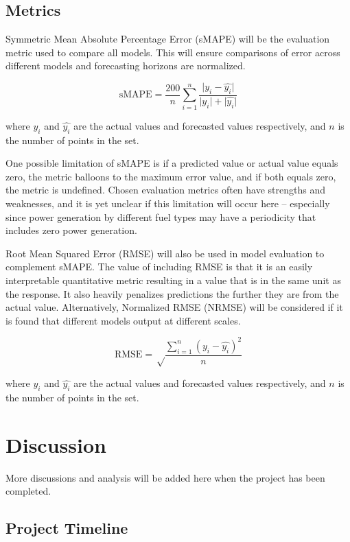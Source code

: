 \documentclass[sigconf]{acmart}
\begin{document}
\subsection{Metrics}
Symmetric Mean Absolute Percentage Error (sMAPE) will be the evaluation metric used to compare all models. This will ensure comparisons of error across different models and forecasting horizons are normalized. 

\begin{equation}
\text{sMAPE} =\frac{200}{n}\sum_{i=1}^{n}\frac{\lvert y_i - \hat{y_i} \rvert}{\lvert y_i \rvert + \lvert \hat{y_i} \rvert}
\end{equation}

where $y_i$ and $\hat{y_i}$ are the actual values and forecasted values respectively, and $n$ is the number of points in the set.

One possible limitation of sMAPE is if a predicted value or actual value equals zero, the metric balloons to the maximum error value, and if both equals zero, the metric is undefined. Chosen evaluation metrics often have strengths and weaknesses, and it is yet unclear if this limitation will occur here -- especially since power generation by different fuel types may have a periodicity that includes zero power generation.

Root Mean Squared Error (RMSE) will also be used in model evaluation to complement sMAPE. The value of including RMSE is that it is an easily interpretable quantitative metric resulting in a value that is in the same unit as the response. It also heavily penalizes predictions the further they are from the actual value. Alternatively, Normalized RMSE (NRMSE) will be considered if it is found that different models output at different scales.

\begin{equation}
\text{RMSE} =\sqrt\frac{\sum_{i=1}^{n}(y_i - \hat{y_i})^2}{n}
\end{equation}

where $y_i$ and $\hat{y_i}$ are the actual values and forecasted values respectively, and $n$ is the number of points in the set.

\section{Discussion}

More discussions and analysis will be added here when the project has been completed.

\subsection{Project Timeline}
\end{document}
